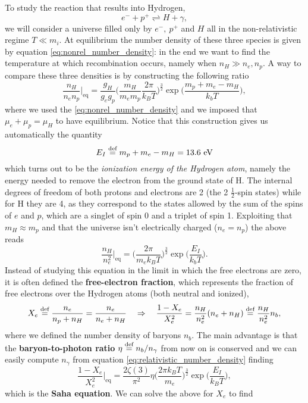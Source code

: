 To study the reaction that results into Hydrogen,
$$
e^-+p^+ \rightleftharpoons H+ \gamma,
$$
we will consider a universe filled only by $e^-,\ p^+$ and $H$ all in the non-relativistic regime $T\ll m_i$. At equilibrium the number density of these three species is given by equation \eqref{eq:nonrel_number_density}: in the end we want to find the temperature at which recombination occurs, namely when $n_H\gg n_e,n_p$. A way to compare these three densities is by constructing the following ratio
$$
\frac{n_H}{n_en_p}\bigg|_\text{eq}=\frac{g_H}{g_eg_p}\bigg(\frac{m_H}{m_em_p}\frac{2\pi}{k_BT}\bigg)^{\frac{3}{2}}\exp\bigg(\frac{m_p+m_e-m_H}{k_bT}\bigg),
$$
where we used the \eqref{eq:nonrel_number_density} and we imposed that $\mu_e+\mu_p=\mu_H$ to have equilibrium. Notice that this construction gives us automatically the quantity
$$
E_I\stackrel{\text{def}}{=} m_p+m_e-m_H=13.6\text{ eV}
$$
which turns out to be the \emph{ionization energy of the Hydrogen atom}, namely the energy needed to remove the electron from the ground state of H. The internal degrees of freedom of both protons and electrons are 2 (the 2 $\tfrac12$-spin states) while for H they are 4, as they correspond to the states allowed by the sum of the spins of $e$ and $p$, which are a singlet of spin 0 and a triplet of spin 1.  Exploiting that $m_H\approx m_p$ and that the universe isn't electrically charged ($n_e=n_p$) the above reads
$$
\frac{n_H}{n_e^2}\bigg|_\text{eq}=\bigg(\frac{2\pi}{m_ek_BT}\bigg)^{\frac{3}{2}}\exp\bigg(\frac{E_I}{k_bT}\bigg).
$$
Instead of studying this equation in the limit in which the free electrons are zero, it is often defined the \textbf{free-electron fraction}, which represents the fraction of free electrons over the Hydrogen atoms (both neutral and ionized),
\begin{equation}
    X_e\stackrel{\text{def}}{=}\frac{n_e}{n_p+n_H}=\frac{n_e}{n_e+n_H}\quad\Rightarrow\quad \frac{1-X_e}{X_e^2}=\frac{n_H}{n^2_e}(n_e+n_H)\stackrel{\text{def}}{=}\frac{n_H}{n^2_e}n_b,
\end{equation}
where we defined the number density of baryons $n_b$. The main advantage is that the \textbf{baryon-to-photon ratio} $\eta\stackrel{\text{def}}{=} n_b/n_\gamma$ from now on is conserved and we can easily compute $n_\gamma$ from equation \eqref{eq:relativistic_number_density} finding
\begin{equation}
    \frac{1-X_e}{X_e^2}\bigg|_\text{eq}=\frac{2\zeta(3)}{\pi^2}\eta\bigg(\frac{2\pi k_BT}{m_e}\bigg)^{\frac{3}{2}}\exp\bigg({\frac{E_I}{k_BT}}\Bigg),\label{eq:Saha}
\end{equation}
which is the \textbf{Saha equation}. We can solve the above for $X_e$ to find
